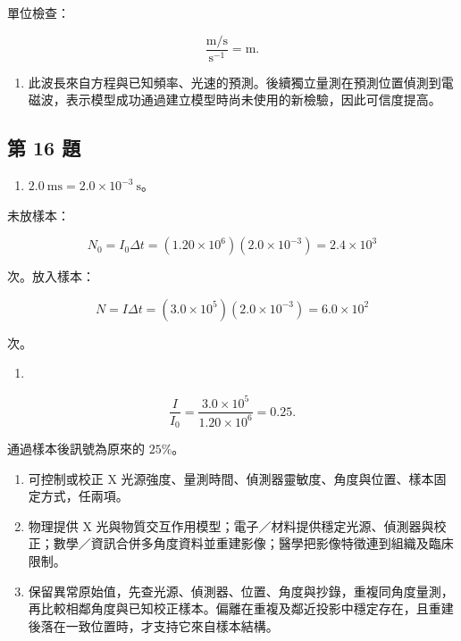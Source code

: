 \documentclass[11pt,a4paper]{article}
\providecommand{\tightlist}{%
  \setlength{\itemsep}{0pt}\setlength{\parskip}{0pt}}
\begin{document}
單位檢查：

\[
\frac{\mathrm{m/s}}{\mathrm{s^{-1}}}=\mathrm m.
\]

\begin{enumerate}
\def\labelenumi{(\arabic{enumi})}
\setcounter{enumi}{3}
\tightlist
\item
  此波長來自方程與已知頻率、光速的預測。後續獨立量測在預測位置偵測到電磁波，表示模型成功通過建立模型時尚未使用的新檢驗，因此可信度提高。
\end{enumerate}

\subsection{第 16 題}\label{ux7b2c-16-ux984c}

\begin{enumerate}
\def\labelenumi{(\arabic{enumi})}
\tightlist
\item
  \(2.0\ \mathrm{ms}=2.0\times10^{-3}\ \mathrm s\)。
\end{enumerate}

未放樣本：

\[
N_0=I_0\Delta t
=(1.20\times10^6)(2.0\times10^{-3})
=2.4\times10^3
\]

次。放入樣本：

\[
N=I\Delta t
=(3.0\times10^5)(2.0\times10^{-3})
=6.0\times10^2
\]

次。

\begin{enumerate}
\def\labelenumi{(\arabic{enumi})}
\setcounter{enumi}{1}
\tightlist
\item
\end{enumerate}

\[
\frac I{I_0}
=\frac{3.0\times10^5}{1.20\times10^6}
=0.25.
\]

通過樣本後訊號為原來的 \(25\%\)。

\begin{enumerate}
\def\labelenumi{(\arabic{enumi})}
\setcounter{enumi}{2}
\item
  可控制或校正 X 光源強度、量測時間、偵測器靈敏度、角度與位置、樣本固定方式，任兩項。
\item
  物理提供 X 光與物質交互作用模型；電子／材料提供穩定光源、偵測器與校正；數學／資訊合併多角度資料並重建影像；醫學把影像特徵連到組織及臨床限制。
\item
  保留異常原始值，先查光源、偵測器、位置、角度與抄錄，重複同角度量測，再比較相鄰角度與已知校正樣本。偏離在重複及鄰近投影中穩定存在，且重建後落在一致位置時，才支持它來自樣本結構。
\end{enumerate}
\end{document}
